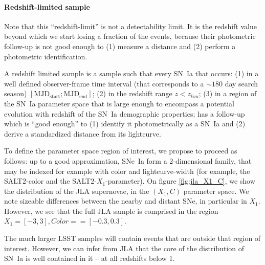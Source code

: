 \documentclass[\docopts]{\docclass}
\begin{document}


\paragraph{Redshift-limited sample} Note that this ``redshift-limit''
is not a detectability limit. It is the redshift value beyond which
we start losing a fraction of the events, because their photometric
follow-up is not good enough to (1) measure a distance and (2) perform
a photometric identification.

A redshift limited sample is a sample such that every SN~Ia that occurs:
(1) in a well defined observer-frame time interval (that corresponds
  to a $\sim 180$ day search season) $\mathrm{[MJD_{start}; MJD_{end}]}$;
(2) in the redshift range $z < z_{lim}$;
(3) in a region of the SN~Ia parameter space that is large enough to
  encompass a potential evolution with redshift of the SN~Ia
  demographic properties;
has a follow-up which is ``good enough'' to (1) identify it
photometrically as a SN~Ia and (2) derive a standardized distance from
its lightcurve.

To define the parameter space region of interest, we propose to
proceed as follows: up to a good approximation, SNe~Ia form a
2-dimensional family, that may be indexed for example with color and
lightcurve-width (for example, the SALT2-color and the
SALT2-$X_1$-parameter).  On figure \ref{fig:jla_X1_C}, we show the
distribution of the JLA supernovae, in the $(X_1,C)$ parameter
space. We note sizeable differences between the nearby and distant
SNe, in particular in $X_1$.  However, we see that the full JLA sample
is comprised in the region $X_1 = [-3,3], Color= = [-0.3, 0.3]$.

The much larger LSST samples will contain events that are outside that
region of interest.  However, we can infer from JLA that the core of
the distribution of SN~Ia is well contained in it -- at all redshifts
below 1.
\end{document}
